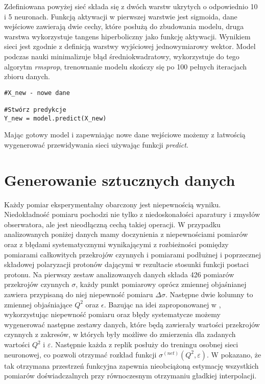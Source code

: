 \documentclass[11pt]{book}
\theoremstyle{definition}
\begin{document}
Zdefiniowana powyżej sieć składa się z dwóch warstw ukrytych o odpowiednio 10 i 5 neuronach. Funkcją aktywacji w pierwszej warstwie jest sigmoida, dane wejściowe zawierają dwie cechy, które posłużą do zbudowania modelu, druga warstwa wykorzystuje tangens hiperboliczny jako funkcję aktywacji. Wynikiem sieci jest zgodnie z definicją warstwy wyjściowej jednowymiarowy wektor. Model podczas nauki minimalizuje błąd średniokwadratowy, wykorzystuje do tego algorytm \textit{rmsprop}, trenownanie modelu skończy się po 100 pełnych iteracjach zbioru danych.

\begin{lstlisting}
#X_new - nowe dane 

#Stwórz predykcje
Y_new = model.predict(X_new)
\end{lstlisting}

Mając gotowy model i zapewniając nowe dane wejściowe możemy z łatwością wygenerować przewidywania sieci używając funkcji \textit{predict}.

\section{Generowanie sztucznych danych}


Każdy pomiar eksperymentalny obarczony jest niepewnością wyniku. Niedokładność pomiaru pochodzi nie tylko z niedoskonałości aparatury i zmysłów obserwatora, ale jest nieodłączną cechą takiej operacji. W przypadku analizowanych poniżej danych mamy doczynienia z niepewnościami pomiarów oraz z błędami systematycznymi wynikającymi z rozbieżności pomiędzy pomiarami całkowitych przekrojów czynnych i pomiarami podłużnej i poprzecznej składowej polaryzacji protonów dającymi w rezultacie stosunki funkcji postaci protonu. Na pierwszy zestaw analizowanych danych składa 426 pomiarów przekrojów czynnych $\sigma$, każdy punkt pomiarowy oprócz zmiennej objaśnianej zawiera przypisaną do niej niepewność pomiaru $\Delta \sigma$. Następne dwie kolumny to zmiennej objaśniające $Q^2$ oraz $\epsilon$. Bazując na idei zaproponowanej w \cite{2002JHEP...05..062F}, wykorzystując niepewność pomiaru oraz błędy systematycze możemy wygenerować następne zestawy danych, które będą zawierały wartości przekrojów czynnych z zakresów, w których były możliwe do zmierzenia dla zadanych wartości $Q^2$ i $\varepsilon$. Następnie każda z replik posłuży do treningu osobnej sieci neuronowej, co pozwoli otrzymać rozkład funkcji $\sigma^{(net)}(Q^2,\varepsilon)$. W \cite{2002JHEP...05..062F} pokazano, że tak otrzymana przestrzeń funkcyjna zapewnia nieobciążoną estymację wszystkich pomiarów doświadczalnych przy równoczesnym otrzymaniu gładkiej interpolacji. 
\end{document}
